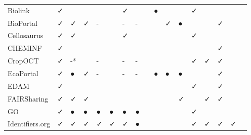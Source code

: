 \begin{table}
\begin{tabular}{lllllllllllllllll}
        Biolink &              ✓ &          &       &            &            &        ✓ &                &               &       ● &         &         &                          ✓ &        &                 &          &        \\
      BioPortal &              ✓ &        ✓ &     ✓ &          - &            &        - &              - &               &         &       ✓ &       ● &                            &        &               ✓ &          &        \\
    Cellosaurus &              ✓ &        ✓ &       &            &            &        ✓ &                &               &         &         &         &                          ✓ &        &                 &          &        \\
        CHEMINF &              ✓ &          &       &            &            &          &                &               &         &         &         &                            &        &               ✓ &          &        \\
        CropOCT &              ✓ &       -* &       &          - &            &        - &              - &               &         &         &         &                          ✓ &      ✓ &               ✓ &          &        \\
      EcoPortal &              ✓ &        ● &     ✓ &          - &            &        - &              - &               &       ● &       ● &       ● &                            &        &               ✓ &          &        \\
           EDAM &              ✓ &          &       &            &            &          &                &               &         &         &         &                          ✓ &        &               ✓ &          &        \\
    FAIRSharing &              ✓ &        ✓ &     ✓ &            &            &          &                &               &         &         &       ✓ &                            &      ✓ &               ✓ &          &        \\
             GO &              ✓ &        ● &     ● &          ● &          ● &        ● &              ● &               &         &         &         &                          ✓ &        &                 &          &        \\
Identifiers.org &              ✓ &        ✓ &     ✓ &          ✓ &          ✓ &        ✓ &              ● &               &         &         &         &                          ✓ &      ✓ &               ✓ &        ✓ &        \\

\end{tabular}
\end{table}
